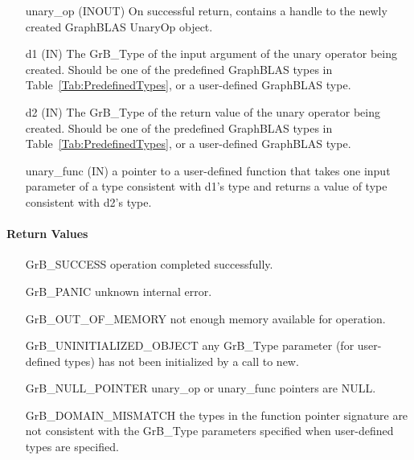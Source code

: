\begin{itemize}[leftmargin=1.1in]
    \item[{\sf unary\_op}] ({\sf INOUT}) On successful return, contains a
                           handle to the newly created GraphBLAS UnaryOp object.
    \item[{\sf d1}] ({\sf IN})  The {\sf GrB\_Type} of the input 
                           argument of the unary operator being created.  Should be 
                           one of the predefined GraphBLAS types in 
                           Table~\ref{Tab:PredefinedTypes}, or a user-defined GraphBLAS type.
    \item[{\sf d2}] ({\sf IN})  The {\sf GrB\_Type} of the return value of the unary 
                           operator being created.  Should be one of the predefined 
                           GraphBLAS types in Table~\ref{Tab:PredefinedTypes}, or a 
                           user-defined GraphBLAS type.
    \item[{\sf unary\_func}] ({\sf IN})  a pointer to a user-defined function that takes 
                           one input parameter of a type consistent with {\sf d1}'s type
                           and returns a value of type consistent with {\sf d2}'s type.  
\end{itemize}

\paragraph{Return Values}

\begin{itemize}[leftmargin=2.1in]
\item[{\sf GrB\_SUCCESS}]           operation completed successfully.
\item[{\sf GrB\_PANIC}]             unknown internal error.
\item[{\sf GrB\_OUT\_OF\_MEMORY}]          not enough memory available for operation.
\item[{\sf GrB\_UNINITIALIZED\_OBJECT}]          any {\sf GrB\_Type} parameter (for
                                    user-defined types) has not been
                                    initialized by a call to {\sf new}.
\item[{\sf GrB\_NULL\_POINTER}]    {\sf unary\_op} or {\sf unary\_func}
                                    pointers are {\sf NULL}.
\item[{\sf GrB\_DOMAIN\_MISMATCH}]  the types in the function pointer signature
                                    are not consistent with the {\sf GrB\_Type}
                                    parameters specified when user-defined types
                                    are specified. 
\end{itemize}

